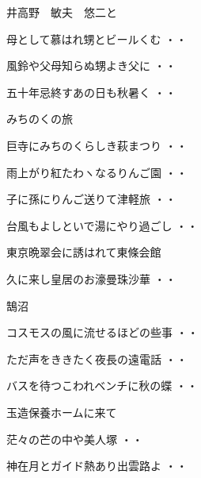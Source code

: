 \vspace{0.6cm}
井高野　敏夫　悠二と
\begin{shiika}母として慕はれ甥とビールくむ
\hfill{・・}\end{shiika}
\begin{shiika}風鈴や父母知らぬ甥よき父に
\hfill{・・}\end{shiika}
\begin{shiika}五十年忌終すあの日も秋暑く
\hfill{・・}\end{shiika}
\vspace{0.6cm}
みちのくの旅
\begin{shiika}巨寺にみちのくらしき萩まつり
\hfill{・・}\end{shiika}
\begin{shiika}雨上がり紅たわヽなるりんご園
\hfill{・・}\end{shiika}
\begin{shiika}子に孫にりんご送りて津軽旅
\hfill{・・}\end{shiika}
\begin{shiika}台風もよしといで湯にやり過ごし
\hfill{・・}\end{shiika}
\vspace{0.6cm}
東京晩翠会に誘はれて東條会館
\begin{shiika}久に来し皇居のお濠曼珠沙華
\hfill{・・}\end{shiika}
\vspace{0.6cm}
鵠沼
\begin{shiika}コスモスの風に流せるほどの些事
\hfill{・・}\end{shiika}
\begin{shiika}ただ声をききたく夜長の遠電話
\hfill{・・}\end{shiika}
\begin{shiika}バスを待つこわれベンチに秋の蝶
\hfill{・・}\end{shiika}
\vspace{0.6cm}
玉造保養ホームに来て
\begin{shiika}茫々の芒の中や美人塚
\hfill{・・}\end{shiika}
\begin{shiika}神在月とガイド熱あり出雲路よ
\hfill{・・}\end{shiika}
